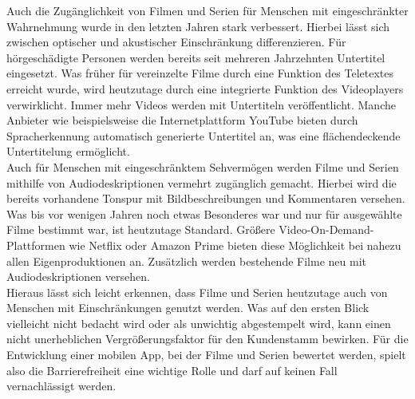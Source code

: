 Auch die Zugänglichkeit von Filmen und Serien für Menschen mit eingeschränkter Wahrnehmung wurde in den letzten Jahren stark verbessert. 
Hierbei lässt sich zwischen optischer und akustischer Einschränkung differenzieren. Für hörgeschädigte Personen werden bereits seit mehreren Jahrzehnten Untertitel eingesetzt. Was früher für vereinzelte Filme durch eine Funktion des Teletextes erreicht wurde, wird heutzutage durch eine integrierte Funktion des Videoplayers verwirklicht. Immer mehr Videos werden mit Untertiteln veröffentlicht. Manche Anbieter wie beispielsweise die Internetplattform YouTube bieten durch Spracherkennung automatisch generierte Untertitel an, was eine flächendeckende Untertitelung ermöglicht.\\
Auch für Menschen mit eingeschränktem Sehvermögen werden Filme und Serien mithilfe von Audiodeskriptionen vermehrt zugänglich gemacht. Hierbei wird die bereits vorhandene Tonspur mit Bildbeschreibungen und Kommentaren versehen. Was bis vor wenigen Jahren noch etwas Besonderes war und nur für ausgewählte Filme bestimmt war, ist heutzutage Standard. Größere Video-On-Demand-Plattformen wie Netflix oder Amazon Prime bieten diese Möglichkeit bei nahezu allen Eigenproduktionen an. Zusätzlich werden bestehende Filme neu mit Audiodeskriptionen versehen.\\


\noindent Hieraus lässt sich leicht erkennen, dass Filme und Serien heutzutage auch von Menschen mit Einschränkungen genutzt werden. Was auf den ersten Blick vielleicht nicht bedacht wird oder als  unwichtig abgestempelt wird, kann einen nicht unerheblichen Vergrößerungsfaktor für den Kundenstamm bewirken. Für die Entwicklung einer mobilen App, bei der Filme und Serien bewertet werden, spielt also die Barrierefreiheit eine wichtige Rolle und darf auf keinen Fall vernachlässigt werden. 
